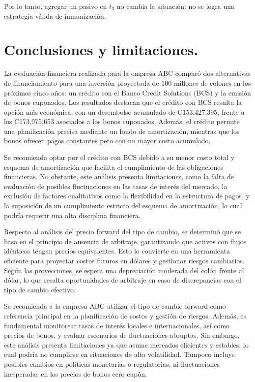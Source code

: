 \documentclass[12pt]{article}
\begin{document}
Por lo tanto, agregar un pasivo en \(t_3\) no cambia la situación: no se logra una estrategia válida de inmunización.


\newpage
\section{Conclusiones y limitaciones.}

La evaluación financiera realizada para la empresa ABC comparó dos alternativas de financiamiento para una inversión proyectada de 100 millones de colones en los próximos cinco años: un crédito con el Banco Credit Solutions (BCS) y la emisión de bonos cuponados. Los resultados destacan que el crédito con BCS resulta la opción más económica, con un desembolso acumulado de ₡153,427,395, frente a los ₡173,975,653 asociados a los bonos cuponados. Además, el crédito permite una planificación precisa mediante un fondo de amortización, mientras que los bonos ofrecen pagos constantes pero con un mayor costo acumulado.

Se recomienda optar por el crédito con BCS debido a su menor costo total y esquema de amortización que facilita el cumplimiento de las obligaciones financieras. No obstante, este análisis presenta limitaciones, como la falta de evaluación de posibles fluctuaciones en las tasas de interés del mercado, la exclusión de factores cualitativos como la flexibilidad en la estructura de pagos, y la suposición de un cumplimiento estricto del esquema de amortización, lo cual podría requerir una alta disciplina financiera.

Respecto al análisis del precio forward del tipo de cambio, se determinó que se basa en el principio de ausencia de arbitraje, garantizando que activos con flujos idénticos tengan precios equivalentes. Esto lo convierte en una herramienta eficiente para proyectar costos futuros en dólares y gestionar riesgos cambiarios. Según las proyecciones, se espera una depreciación moderada del colón frente al dólar, lo que resalta oportunidades de arbitraje en caso de discrepancias con el tipo de cambio efectivo.

Se recomienda a la empresa ABC utilizar el tipo de cambio forward como referencia principal en la planificación de costos y gestión de riesgos. Además, es fundamental monitorear tasas de interés locales e internacionales, así como precios de bonos, y evaluar escenarios de fluctuaciones abruptas. Sin embargo, este análisis presenta limitaciones ya que asume mercados eficientes y estables, lo cual podría no cumplirse en situaciones de alta volatilidad. Tampoco incluye posibles cambios en políticas monetarias o regulatorias, ni fluctuaciones inesperadas en los precios de bonos cero cupón.
\end{document}
